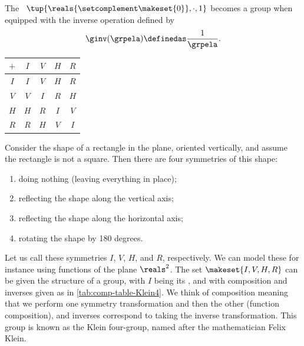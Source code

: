 

\begin{example}
    The ~$\tup{\reals{\setcomplement \makeset{0}}, \cdot, 1}$ becomes a group when equipped with the inverse operation defined by
    \begin{equation}
        \ginv(\grpela) \definedas \frac{1}{\grpela}.
    \end{equation}
\end{example}

\begin{margintable}
    \caption{The Klein four group}
    \label{tab:comp-table-Klein4}
    \centering
    \begin{tabular}{c|cccc}
        $+$ & $I$ & $V$ & $H$ & $R$ \\
        \hline
        $I$ & $I$ & $V$ & $H$ & $R$ \\
        $V$ & $V$ & $I$ & $R$ & $H$ \\
        $H$ & $H$ & $R$ & $I$ & $V$ \\
        $R$ & $R$ & $H$ & $V$ & $I$
    \end{tabular}
\end{margintable}
\begin{example}
    \label{exa:grp-Klein4}
    Consider the shape of a rectangle in the plane, oriented vertically, and assume the rectangle is not a square.
    Then there are four symmetries of this shape:
    \begin{enumerate}
        \item doing nothing (leaving everything in place);
        \item reflecting the shape along the vertical axis;
        \item reflecting the shape along the horizontal axis;
        \item rotating the shape by 180 degrees.
    \end{enumerate}
    Let us call these symmetries $I$, $V$, $H$, and $R$, respectively.
    We can model these for instance using  functions of the plane $\reals^2$.
    The set $\makeset{I, V, H, R}$ can be given the structure of a group, with $I$ being its , and with composition and inverses given as in \cref{tab:comp-table-Klein4}.
    We think of composition meaning that we perform one symmetry transformation and then the other (function composition), and inverses correspond to taking the inverse transformation.
    This group is known as the Klein four-group, named after the mathematician Felix Klein.
\end{example}


